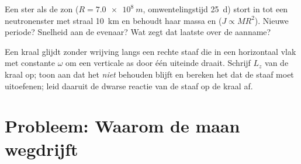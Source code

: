 \begin{exercise}[$\star\star\star$]\label{exo:b1:angular-momentum:11}
Een ster als de zon ($R = \qty{7.0e8}{m}$, omwentelingstijd \qty{25}{d})
stort in tot een neutronenster met straal \qty{10}{km} en behoudt haar massa
en  ($J \propto MR^2$). Nieuwe periode? Snelheid aan de evenaar?
Wat zegt dat laatste over de aanname?
\end{exercise}

\begin{exercise}[$\star\star\star$]\label{exo:b1:angular-momentum:12}
Een kraal glijdt zonder wrijving langs een rechte staaf die in een
horizontaal vlak met constante $\omega$ om een verticale as door één
uiteinde draait. Schrijf $L_z$ van de kraal op; toon aan dat het \emph{niet} behouden blijft
en bereken het  dat de staaf moet uitoefenen; leid daaruit de dwarse reactie
van de staaf op de kraal af.
\end{exercise}

\section{Probleem: Waarom de maan wegdrijft}

